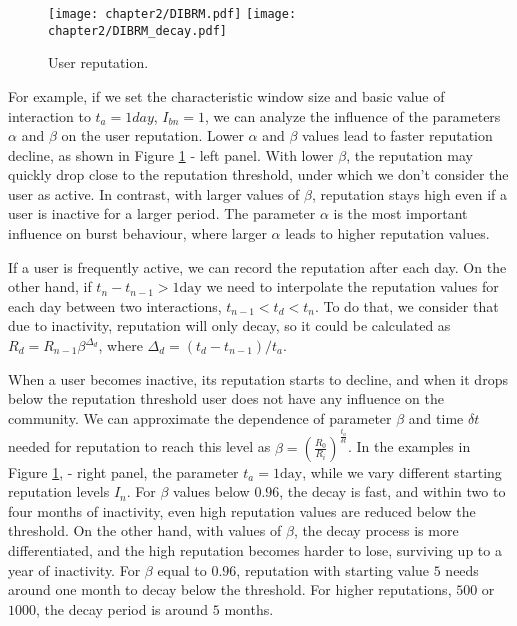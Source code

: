 \begin{figure}[h]
	\centering
	\texttt{[image: chapter2/DIBRM.pdf]}
	\texttt{[image: chapter2/DIBRM\_decay.pdf]}
	\caption{User reputation.}
	\label{fig:reputation}
\end{figure}  

For example, if we set the characteristic window size and basic value of interaction to $t_a=1 day$, $I_{bn}=1$, we can analyze the influence of the parameters $\alpha$ and $\beta$ on the user reputation. Lower $\alpha$ and $\beta$ values lead to faster reputation decline, as shown in Figure \ref{fig:reputation} - left panel. With lower $\beta$, the reputation may quickly drop close to the reputation threshold, under which we don't consider the user as active. In contrast, with larger values of $\beta$, reputation stays high even if a user is inactive for a larger period. The parameter $\alpha$ is the most important influence on burst behaviour, where larger $\alpha$ leads to higher reputation values. 

If a user is frequently active, we can record the reputation after each day. On the other hand, if $t_n-t_{n-1}>1 \text{day}$ we need to interpolate the reputation values for each day between two interactions, $t_{n-1}<t_d<t_{n}$. To do that, we consider that due to inactivity, reputation will only decay, so it could be calculated as $R_d = R_{n-1}\beta^{\Delta_d}$, where $\Delta_d=(t_{d}-t_{n-1})/t_a$. 

When a user becomes inactive, its reputation starts to decline, and when it drops below the reputation threshold user does not have any influence on the community. We can approximate the dependence of parameter $\beta$ and time $\delta t$ needed for reputation to reach this level as $\beta = (\frac{R_0}{R_i})^{\frac{t_a}{\delta t}}$. In the examples in Figure \ref{fig:reputation}, - right panel, the parameter $t_a=1\text{day}$, while we vary different starting reputation levels $I_n$.   
For $\beta$ values below $0.96$, the decay is fast, and within two to four months of inactivity, even high reputation values are
reduced below the threshold. On the other hand, with values of $\beta$, the decay process is more differentiated, and the high
reputation becomes harder to lose, surviving up to a year of inactivity. For $\beta$ equal to $0.96$, reputation with starting value $5$ needs around one month to decay below the threshold. For higher reputations, $500$ or $1000$, the decay period is around $5$ months. 

